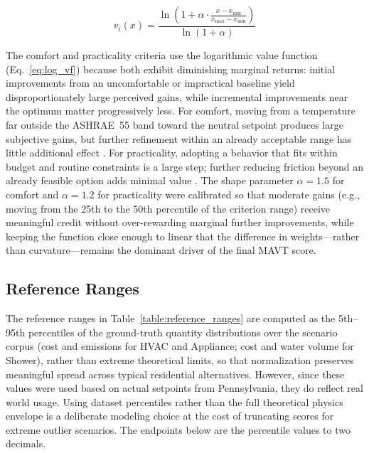\documentclass[final,3p,times]{elsarticle}
\begin{document}
\begin{equation}
\label{eq:log_vf}
v_i(x) = \frac{\ln\!\left(1 + \alpha \cdot \frac{x - x_{\min}}{x_{\max} - x_{\min}}\right)}{\ln(1 + \alpha)}
\end{equation}

The comfort and practicality criteria use the logarithmic value function (Eq.~\ref{eq:log_vf}) because both exhibit diminishing marginal returns: initial improvements from an uncomfortable or impractical baseline yield disproportionately large perceived gains, while incremental improvements near the optimum matter progressively less. For comfort, moving from a temperature far outside the ASHRAE~55 band toward the neutral setpoint produces large subjective gains, but further refinement within an already acceptable range has little additional effect \cite{ashrae55,dedear2002}. For practicality, adopting a behavior that fits within budget and routine constraints is a large step; further reducing friction beyond an already feasible option adds minimal value \cite{ariely2001,leclerc1995}. The shape parameter $\alpha = 1.5$ for comfort and $\alpha = 1.2$ for practicality were calibrated so that moderate gains (e.g., moving from the 25th to the 50th percentile of the criterion range) receive meaningful credit without over-rewarding marginal further improvements, while keeping the function close enough to linear that the difference in weights---rather than curvature---remains the dominant driver of the final MAVT score.

\subsection{Reference Ranges}

The reference ranges in Table~\ref{table:reference_ranges} are computed as the 5th--95th percentiles of the ground-truth quantity distributions over the scenario corpus (cost and emissions for HVAC and Appliance; cost and water volume for Shower), rather than extreme theoretical limits, so that normalization preserves meaningful spread across typical residential alternatives. However, since these values were used based on actual setpoints from Pennsylvania, they do reflect real world usage. Using dataset percentiles rather than the full theoretical physics envelope is a deliberate modeling choice \cite{roszkowska2026} at the cost of truncating scores for extreme outlier scenarios. The endpoints below are the percentile values to two decimals.
\end{document}
